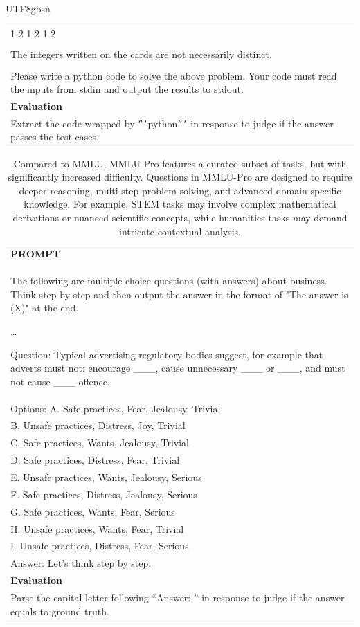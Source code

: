 \documentclass[11pt, a4paper, logo, copyright, nonumbering]{deepseek}
\begin{document}
\begin{CJK*}{UTF8}{gbsn}
\begin{table}[h]
\begin{tabular}{p{}}
1 2 1 2 1 2\\
\\
The integers written on the cards are not necessarily distinct.\\
\\
Please write a python code to solve the above problem. Your code must read the inputs from stdin and output the results to stdout.\\ \hline
      \textbf{Evaluation}\\
      Extract the code wrapped by \texttt{```}python\texttt{```} in response to judge if the answer passes the test cases. \\ \hline
    \end{tabular}
\end{table}

\begin{table}[h]
    \centering \small
        \caption{Compared to MMLU, MMLU-Pro features a curated subset of tasks, but with significantly increased difficulty. Questions in MMLU-Pro are designed to require deeper reasoning, multi-step problem-solving, and advanced domain-specific knowledge. For example, STEM tasks may involve complex mathematical derivations or nuanced scientific concepts, while humanities tasks may demand intricate contextual analysis. }
    \label{tab:mmlu-pro}
    \begin{tabular}{p{}}
    \hline
    \textbf{PROMPT}\\
    The following are multiple choice questions (with answers) about business. Think step by step and then output the answer in the format of "The answer is (X)" at the end.

\ldots

Question: Typical advertising regulatory bodies suggest, for example that adverts must not: encourage \_\_\_, cause unnecessary \_\_\_ or \_\_\_, and must not cause \_\_\_ offence. \\
Options: A. Safe practices, Fear, Jealousy, Trivial \\
B. Unsafe practices, Distress, Joy, Trivial \\
C. Safe practices, Wants, Jealousy, Trivial \\
D. Safe practices, Distress, Fear, Trivial \\
E. Unsafe practices, Wants, Jealousy, Serious \\
F. Safe practices, Distress, Jealousy, Serious \\
G. Safe practices, Wants, Fear, Serious \\
H. Unsafe practices, Wants, Fear, Trivial \\
I. Unsafe practices, Distress, Fear, Serious \\
Answer: Let's think step by step.\\ \hline
      \textbf{Evaluation}\\
      Parse the capital letter following ``Answer: '' in response to judge if the answer equals to ground truth. \\ \hline
    \end{tabular}
\end{table}


\end{CJK*}
\end{document}
